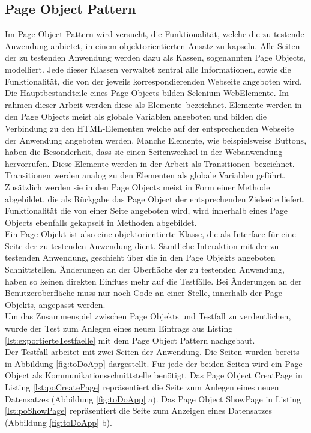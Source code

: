 \subsection{Page Object Pattern}
\label{sec:page_object_pattern}
Im Page Object Pattern wird versucht, die Funktionalität, welche die zu testende Anwendung anbietet, in einem objektorientierten Ansatz zu kapseln.
Alle Seiten der zu testenden Anwendung werden dazu als Kassen, sogenannten Page Objects, modelliert. Jede dieser Klassen verwaltet zentral alle Informationen, sowie die Funktionalität, die von der jeweils korrespondierenden Webseite angeboten wird. Die Hauptbestandteile eines Page Objects bilden Selenium-WebElemente. Im rahmen dieser Arbeit werden diese als \grq Elemente\grq\ bezeichnet. Elemente werden in den Page Objects meist als globale Variablen angeboten und bilden die Verbindung zu den HTML-Elementen welche auf der entsprechenden Webseite der Anwendung angeboten werden. Manche Elemente, wie beispielsweise Buttons, haben die Besonderheit, dass sie einen Seitenwechsel in der Webanwendung hervorrufen. Diese Elemente werden in der Arbeit als \grq Transitionen\grq\ bezeichnet. Transitionen werden analog zu den Elementen als globale Variablen geführt. Zusätzlich werden sie in den Page Objects meist in Form einer Methode abgebildet, die als Rückgabe das Page Object der entsprechenden Zielseite liefert. Funktionalität die von einer Seite angeboten wird, wird innerhalb eines Page Objects ebenfalls gekapselt in Methoden abgebildet.\\
Ein Page Objekt ist also eine objektorientierte Klasse, die als Interface für eine Seite der zu testenden Anwendung dient.
Sämtliche Interaktion mit der zu testenden Anwendung, geschieht über die in den Page Objekts angeboten Schnittstellen.
Änderungen an der Oberfläche der zu testenden Anwendung, haben so keinen direkten Einfluss mehr auf die Testfälle. Bei Änderungen an der Benutzeroberfläche muss nur noch Code an einer Stelle, innerhalb der Page Objekts, angepasst werden.\\
Um das Zusammenspiel zwischen Page Objekts und Testfall zu verdeutlichen, wurde der Test zum Anlegen eines neuen Eintrags aus Listing \ref{lst:exportierteTestfaelle} mit dem Page Object Pattern nachgebaut.\\
Der Testfall arbeitet mit zwei Seiten der Anwendung. Die Seiten wurden bereits in Abbildung \ref{fig:toDoApp} dargestellt. Für jede der beiden Seiten wird ein Page Object als Kommunikationsschnittstelle benötigt. 
Das Page Object CreatPage in Listing \ref{lst:poCreatePage} repräsentiert die Seite zum Anlegen eines neuen Datensatzes (Abbildung \ref{fig:toDoApp} a). Das Page Object ShowPage in Listing \ref{lst:poShowPage} repräsentiert die Seite zum Anzeigen eines Datensatzes (Abbildung \ref{fig:toDoApp} b).

